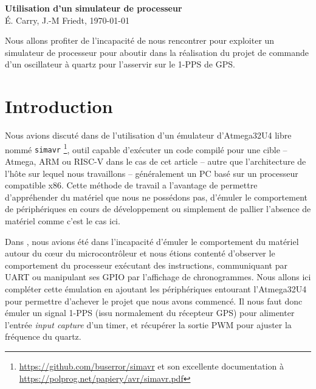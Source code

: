 \documentclass[a4paper]{article}
\begin{document}
\begin{center}
{\bf\Large Utilisation d'un simulateur de processeur}\\
\'E. Carry, J.-M Friedt, \today
\end{center}

Nous allons profiter de l'incapacit\'e de nous rencontrer pour exploiter
un simulateur de processeur pour aboutir dans la r\'ealisation du projet
de commande d'un oscillateur \`a quartz pour l'asservir sur le 1-PPS de
GPS.

\section{Introduction}

Nous avions discut\'e dans \cite{emu} de l'utilisation d'un \'emulateur
d'Atmega32U4 libre nomm\'e {\tt simavr} 
\footnote{\url{https://github.com/buserror/simavr} et son excellente 
documentation \`a \url{https://polprog.net/papiery/avr/simavr.pdf}}, outil 
capable d'ex\'ecuter un code compil\'e pour une cible -- Atmega, ARM ou RISC-V 
dans le cas de cet article -- autre que l'architecture de l'h\^ote sur lequel 
nous travaillons -- g\'en\'eralement un PC bas\'e sur un processeur compatible 
x86. Cette m\'ethode de travail a l'avantage de permettre d'appr\'ehender du 
mat\'eriel que nous ne poss\'edons pas, d'\'emuler le comportement de 
p\'eriph\'eriques en cours de d\'eveloppement ou simplement de pallier 
l'absence de mat\'eriel comme c'est le cas ici.

Dans \cite{emu}, nous avions \'et\'e dans l'incapacit\'e d'\'emuler le 
comportement du mat\'eriel autour du c\oe ur du microcontr\^oleur et nous 
\'etions content\'e d'observer le comportement du processeur ex\'ecutant des 
instructions, communiquant par UART ou manipulant ses GPIO par l'affichage de 
chronogrammes. Nous allons ici compl\'eter cette \'emulation en ajoutant les 
p\'eriph\'eriques entourant l'Atmega32U4 pour permettre d'achever le projet 
que nous avons commenc\'e. Il nous faut donc \'emuler un signal 1-PPS (issu 
normalement du r\'ecepteur GPS) pour alimenter l'entr\'ee {\em input capture} 
d'un timer, et r\'ecup\'erer la sortie PWM pour ajuster la fr\'equence du 
quartz.

\noindent{}
\end{document}
